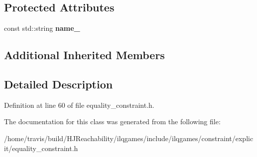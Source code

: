 \subsection*{Protected Attributes}
\begin{DoxyCompactItemize}
\item 
const std\+::string {\bfseries name\+\_\+}\hypertarget{classilqgames_1_1_equality_constraint_abeab686136859029d332623049d10fa8}{}\label{classilqgames_1_1_equality_constraint_abeab686136859029d332623049d10fa8}

\end{DoxyCompactItemize}
\subsection*{Additional Inherited Members}


\subsection{Detailed Description}


Definition at line 60 of file equality\+\_\+constraint.\+h.



The documentation for this class was generated from the following file\+:\begin{DoxyCompactItemize}
\item 
/home/travis/build/\+H\+J\+Reachability/ilqgames/include/ilqgames/constraint/explicit/equality\+\_\+constraint.\+h\end{DoxyCompactItemize}
